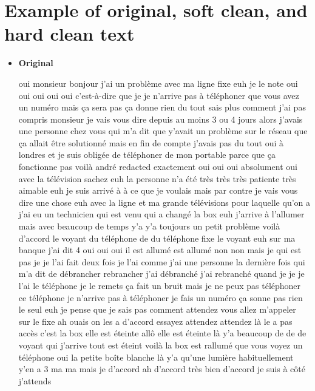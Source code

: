 
\chapter{Example of original, soft clean, and hard clean text}

\begin{itemize}
    \item \textbf{Original}
    
    oui monsieur bonjour j'ai un problème avec ma ligne fixe euh je le note oui oui oui oui oui c'est-à-dire que je je n'arrive pas à téléphoner que vous avez un numéro mais ça sera pas ça donne rien du tout sais plus comment j'ai pas compris monsieur je vais vous dire depuis au moins 3 ou 4 jours alors j'avais une personne chez vous qui m'a dit que y'avait un problème sur le réseau que ça allait être solutionné mais en fin de compte j'avais pas du tout oui à londres et je suis obligée de téléphoner de mon portable parce que ça fonctionne pas voilà andré redacted exactement oui oui oui absolument oui avec la télévision sachez euh la personne n'a été très très très patiente très aimable euh je suis arrivé à à ce que je voulais mais par contre je vais vous dire une chose euh avec la ligne et ma grande télévisions pour laquelle qu'on a j'ai eu un technicien qui est venu qui a changé la box euh j'arrive à l'allumer mais avec beaucoup de temps y'a y'a toujours un petit problème voilà d'accord le voyant du téléphone de du téléphone fixe le voyant euh sur ma banque j'ai dit 4 oui oui oui il est allumé est allumé non non mais je qui est pas je je l'ai fait deux fois je l'ai comme j'ai une personne la dernière fois qui m'a dit de débrancher rebrancher j'ai débranché j'ai rebranché quand je je je l'ai le téléphone je le remets ça fait un bruit mais je ne peux pas téléphoner ce téléphone je n'arrive pas à téléphoner je fais un numéro ça sonne pas rien le seul euh je pense que je sais pas comment attendez vous allez m'appeler sur le fixe ah ouais on les a d'accord essayez attendez attendez là le a pas accès c'est la box elle est éteinte allô elle est éteinte là y'a beaucoup de de de voyant qui j'arrive tout est éteint voilà la box est rallumé que vous voyez un téléphone oui la petite boîte blanche là y'a qu'une lumière habituellement y'en a 3 ma ma mais je d'accord ah d'accord très bien d'accord je suis à côté j'attends


\end{itemize}
